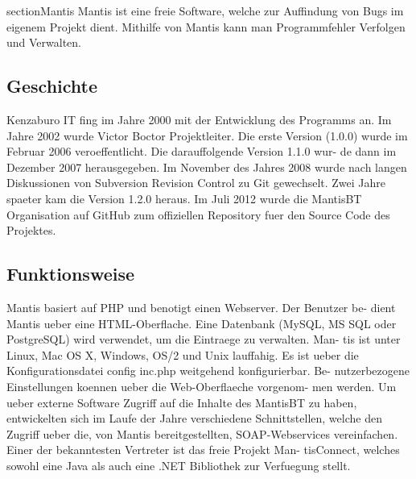 section{Mantis}
Mantis ist eine freie Software, welche zur Auffindung von Bugs im eigenem
Projekt dient. Mithilfe von Mantis kann man Programmfehler Verfolgen und
Verwalten.
\subsection{Geschichte}
Kenzaburo IT fing im Jahre 2000 mit der Entwicklung des Programms an.
Im Jahre 2002 wurde Victor Boctor Projektleiter. Die erste Version (1.0.0)
wurde im Februar 2006 veroeffentlicht. Die darauffolgende Version 1.1.0 wur-
de dann im Dezember 2007 herausgegeben. Im November des Jahres 2008
wurde nach langen Diskussionen von Subversion Revision Control zu Git
gewechselt. Zwei Jahre spaeter kam die Version 1.2.0 heraus. Im Juli 2012
wurde die MantisBT Organisation auf GitHub zum offiziellen Repository
fuer den Source Code des Projektes.
\subsection{Funktionsweise}
Mantis basiert auf PHP und benotigt einen Webserver. Der Benutzer be-
dient Mantis ueber eine HTML-Oberflache. Eine Datenbank (MySQL, MS
SQL oder PostgreSQL) wird verwendet, um die Eintraege zu verwalten. Man-
tis ist unter Linux, Mac OS X, Windows, OS/2 und Unix lauffahig. Es ist
ueber die Konfigurationsdatei config inc.php weitgehend konfigurierbar. Be-
nutzerbezogene Einstellungen koennen ueber die Web-Oberflaeche vorgenom-
men werden. Um ueber externe Software Zugriff auf die Inhalte des MantisBT
zu haben, entwickelten sich im Laufe der Jahre verschiedene Schnittstellen,
welche den Zugriff ueber die, von Mantis bereitgestellten, SOAP-Webservices
vereinfachen. Einer der bekanntesten Vertreter ist das freie Projekt Man-
tisConnect, welches sowohl eine Java als auch eine .NET Bibliothek zur
Verfuegung stellt.
